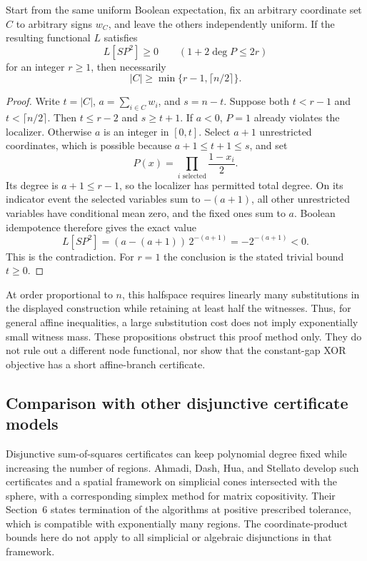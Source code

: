 \begin{proposition}
\label{prop:affine-substitution-obstruction}
Start from the same uniform Boolean expectation, fix an arbitrary
coordinate set $C$ to arbitrary signs $w_C$, and leave the others
independently uniform. If the resulting functional $L$ satisfies
\[
 L[SP^2]\ge0\qquad(1+2\deg P\le2r)
\]
for an integer $r\ge1$, then necessarily
\begin{equation}\label{eq:affine-substitution-count}
 |C|\ge\min\{r-1,\lceil n/2\rceil\}.
\end{equation}
\end{proposition}
\begin{proof}
Write $t=|C|$, $a=\sum_{i\in C}w_i$, and $s=n-t$. Suppose both
$t<r-1$ and $t<\lceil n/2\rceil$. Then $t\le r-2$ and $s\ge t+1$.
If $a<0$, $P=1$ already violates the localizer. Otherwise $a$ is an
integer in $[0,t]$. Select $a+1$ unrestricted coordinates, which is
possible because $a+1\le t+1\le s$, and set
\[
 P(x)=\prod_{i\text{ selected}}\frac{1-x_i}{2}.
\]
Its degree is $a+1\le r-1$, so the localizer has permitted total degree.
On its indicator event the selected variables sum to $-(a+1)$, all
other unrestricted variables have conditional mean zero, and the fixed
ones sum to $a$. Boolean idempotence therefore gives the exact value
\[
 L[SP^2]=(a-(a+1))\,2^{-(a+1)}=-2^{-(a+1)}<0.
\]
This is the contradiction. For $r=1$ the conclusion is the stated trivial
bound $t\ge0$.
\end{proof}

At order proportional to $n$, this halfspace requires linearly many
substitutions in the displayed construction while retaining at least half
the witnesses. Thus, for general affine inequalities, a large substitution
cost does not imply exponentially small witness mass. These propositions
obstruct this proof method only. They do not rule out a different node
functional, nor show that the constant-gap XOR objective has a short
affine-branch certificate.

\subsection{Comparison with other disjunctive certificate models}
\label{subsec:xor-literature-boundary}
Disjunctive sum-of-squares certificates can keep polynomial degree fixed
while increasing the number of regions. Ahmadi, Dash, Hua, and Stellato
\citep[Sections 2--4 and 6]{AhmadiEtAl2026} develop such certificates
and a spatial framework on simplicial cones intersected with the sphere,
with a corresponding simplex method for matrix copositivity. Their
Section~6 states termination of the algorithms at positive prescribed
tolerance, which is compatible with exponentially many regions. The
coordinate-product bounds here do not apply to all simplicial or
algebraic disjunctions in that framework.

